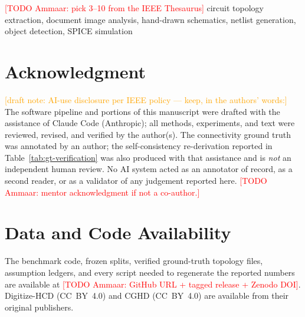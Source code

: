\documentclass{ieeeaccess}%
\newcommand{\todoa}[1]{\textcolor{red}{[TODO Ammaar: #1]}}
\newcommand{\draftnote}[1]{\textcolor{orange}{[draft note: #1]}}
\begin{document}
\begin{IEEEkeywords}
\todoa{pick 3--10 from the IEEE Thesaurus} circuit topology extraction,
document image analysis, hand-drawn schematics, netlist generation,
object detection, SPICE simulation
\end{IEEEkeywords}

\IEEEpeerreviewmaketitle










\section*{Acknowledgment}
\draftnote{AI-use disclosure per IEEE policy — keep, in the authors'
words:} The software pipeline and portions of this manuscript were
drafted with the assistance of Claude Code (Anthropic); all methods,
experiments, and text were reviewed, revised, and verified by the
author(s). The connectivity ground truth was annotated by an author; the
self-consistency re-derivation reported in
Table~\ref{tab:gt-verification} was also produced with that assistance
and is \emph{not} an independent human review. No AI system acted as an
annotator of record, as a second reader, or as a validator of any
judgement reported here.
\todoa{mentor acknowledgment if not a co-author.}

\section*{Data and Code Availability}
The benchmark code, frozen splits, verified ground-truth topology
files, assumption ledgers, and every script needed to regenerate the
reported numbers are available at \todoa{GitHub URL + tagged release +
Zenodo DOI}. Digitize-HCD \cite{digitizehcd_data} (CC~BY~4.0) and
CGHD \cite{cghd} (CC~BY~4.0) are available from their original
publishers.

% 
% 

\end{document}
